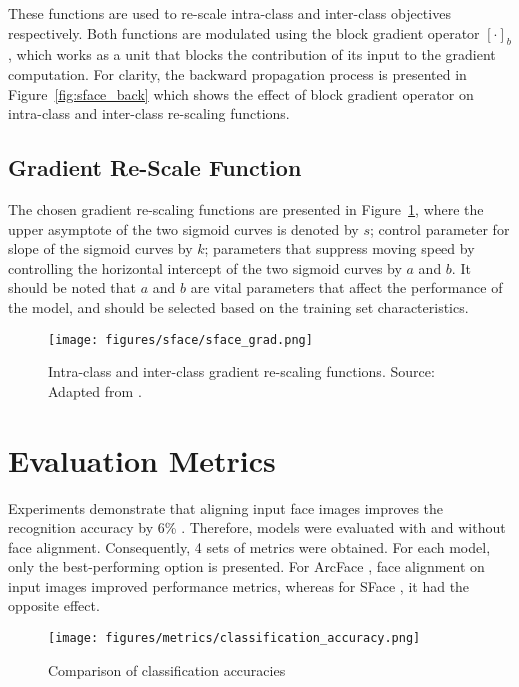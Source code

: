 \documentclass[10pt,a4paper,twoside]{article}
\begin{document}
These functions are used to re-scale intra-class and inter-class objectives respectively. Both functions are modulated using the block gradient operator \( [\cdot]_b \), which works as a unit that blocks the contribution of its input to the gradient computation. For clarity, the backward propagation process is presented in Figure~\ref{fig:sface_back} which shows the effect of block gradient operator on intra-class and inter-class re-scaling functions.


\subsection{Gradient Re-Scale Function}

The chosen gradient re-scaling functions are presented in Figure~\ref{fig:sface_gradscale}, where the upper asymptote of the two sigmoid curves is denoted by \( s \); control parameter for slope of the sigmoid curves by \( k \); parameters that suppress moving speed by controlling the horizontal intercept of the two sigmoid curves by \( a \) and \( b \). It should be noted that \( a \) and \( b \) are vital parameters that affect the performance of the model, and should be selected based on the training set characteristics.

\begin{figure}[h]
    \centering
    \texttt{[image: figures/sface/sface\_grad.png]} 
    \caption{Intra-class and inter-class gradient re-scaling functions. Source: Adapted from \cite{sface}.}
    \label{fig:sface_gradscale}
\end{figure}


\section{Evaluation Metrics}
\label{sec:eval}
Experiments demonstrate that aligning input face images improves the recognition accuracy by 6\% \cite{deepface}. Therefore, models were evaluated with and without face alignment. Consequently, 4 sets of metrics were obtained. For each model, only the best-performing option is presented. For ArcFace \cite{arcface}, face alignment on input images improved performance metrics, whereas for SFace \cite{sface}, it had the opposite effect.

\begin{figure}[h]
    \centering
    \texttt{[image: figures/metrics/classification\_accuracy.png]} 
    \caption{Comparison of classification accuracies}
    \label{fig:clf_acc}
\end{figure}
\end{document}
